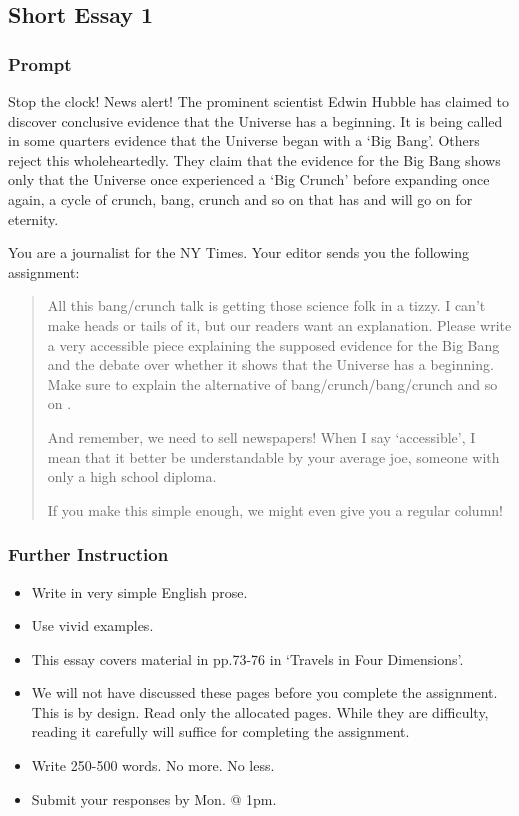 \documentclass[]{article}
\begin{document}
\subsection{Short Essay 1}\label{short-essay-1}

\subsubsection{Prompt}\label{prompt}

Stop the clock! News alert! The prominent scientist Edwin Hubble has
claimed to discover conclusive evidence that the Universe has a
beginning. It is being called in some quarters evidence that the
Universe began with a `Big Bang'. Others reject this wholeheartedly.
They claim that the evidence for the Big Bang shows only that the
Universe once experienced a `Big Crunch' before expanding once again, a
cycle of crunch, bang, crunch and so on that has and will go on for
eternity.

You are a journalist for the NY Times. Your editor sends you the
following assignment:

\begin{quote}
All this bang/crunch talk is getting those science folk in a tizzy. I
can't make heads or tails of it, but our readers want an explanation.
Please write a very accessible piece explaining the supposed evidence
for the Big Bang and the debate over whether it shows that the Universe
has a beginning. Make sure to explain the alternative of
bang/crunch/bang/crunch and so on .

And remember, we need to sell newspapers! When I say `accessible', I
mean that it better be understandable by your average joe, someone with
only a high school diploma.

If you make this simple enough, we might even give you a regular column!
\end{quote}

\subsubsection{Further Instruction}\label{further-instruction}

\begin{itemize}
\itemsep1pt\parskip0pt
\item
  Write in very simple English prose.\\
\item
  Use vivid examples.
\item
  This essay covers material in pp.73-76 in `Travels in Four
  Dimensions'.
\item
  We will not have discussed these pages before you complete the
  assignment. This is by design. Read only the allocated pages. While
  they are difficulty, reading it carefully will suffice for completing
  the assignment.
\item
  Write 250-500 words. No more. No less.
\item
  Submit your responses by Mon. @ 1pm.
\end{itemize}
\end{document}
